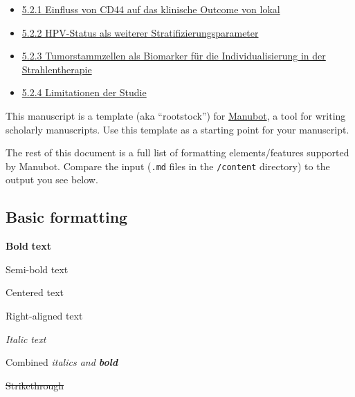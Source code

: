 \begin{itemize}
\begin{itemize}
    \begin{itemize}
    \item
      \protect\hyperlink{5-2-1-einfluss-von-cd44-auf-das-klinische-outcome-von-lokal}{5.2.1 Einfluss von CD44 auf das klinische Outcome von lokal}
    \item
      \protect\hyperlink{5-2-2-hpv-status-als-weiterer-stratifizierungsparameter}{5.2.2 HPV-Status als weiterer Stratifizierungsparameter}
    \item
      \protect\hyperlink{5-2-3-tumorstammzellen-als-biomarker-fuxfcr-die-individualisierung-in-der-strahlentherapie}{5.2.3 Tumorstammzellen als Biomarker für die Individualisierung in der Strahlentherapie}
    \item
      \protect\hyperlink{5-2-4-limitationen-der-studie}{5.2.4 Limitationen der Studie}
    \end{itemize}
  \end{itemize}
\end{itemize}

This manuscript is a template (aka ``rootstock'') for \href{https://manubot.org/}{Manubot}, a tool for writing scholarly manuscripts.
Use this template as a starting point for your manuscript.

The rest of this document is a full list of formatting elements/features supported by Manubot.
Compare the input (\texttt{.md} files in the \texttt{/content} directory) to the output you see below.

\hypertarget{basic-formatting}{%
\subsection{Basic formatting}\label{basic-formatting}}

\textbf{Bold} \textbf{text}

{Semi-bold text}

{Centered text}

{Right-aligned text}

\emph{Italic} \emph{text}

Combined \emph{italics and \textbf{bold}}

\sout{Strikethrough}

